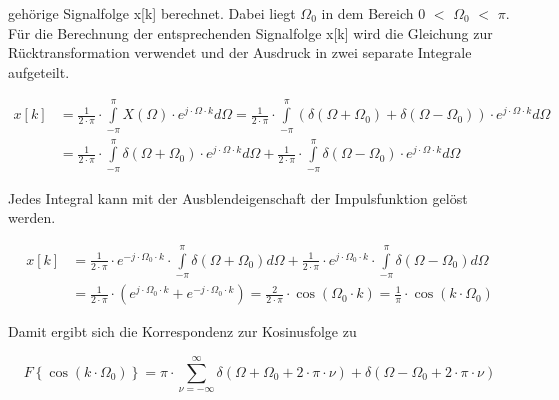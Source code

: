 \noindent geh\"{o}rige Signalfolge x[k] berechnet. Dabei liegt $\Omega_{0}$ in dem Bereich 0 $\mathrm{<}$ $\Omega_{0}$ $\mathrm{<}$ $\pi$. F\"{u}r die Berechnung der entsprechenden Signalfolge x[k] wird die Gleichung zur R\"{u}cktransformation verwendet und der Ausdruck in zwei separate Integrale aufgeteilt.

\begin{equation}\label{eq:sevenfourtysix}
\begin{split}
x\left[k\right] &=\frac{1}{2\cdot \pi } \cdot \int\limits _{-\pi }^{\pi }X\left(\Omega \right)\cdot e^{j\cdot \Omega \cdot k}d\Omega  =\frac{1}{2\cdot \pi } \cdot \int\limits _{-\pi }^{\pi }\left(\delta \left(\Omega +\Omega _{0} \right)+\delta \left(\Omega -\Omega _{0} \right)\right)\cdot e^{j\cdot \Omega \cdot k}d\Omega\\ 
&=\frac{1}{2\cdot \pi} \cdot\int\limits _{-\pi }^{\pi }\delta \left(\Omega +\Omega _{0} \right)\cdot e^{j\cdot \Omega \cdot k}d\Omega+\frac{1}{2\cdot \pi} \cdot\int\limits _{-\pi }^{\pi }\delta \left(\Omega -\Omega _{0} \right)\cdot e^{j\cdot \Omega \cdot k}d\Omega
\end{split}
\end{equation}

\noindent Jedes Integral kann mit der Ausblendeigenschaft der Impulsfunktion gel\"{o}st werden.

\begin{equation}\label{eq:sevenfourtyseven}
\begin{split}
x\left[k\right] &=\frac{1}{2\cdot \pi } \cdot e^{-j\cdot \Omega _{0} \cdot k} \cdot \int\limits _{-\pi }^{\pi }\delta \left(\Omega +\Omega _{0} \right)d\Omega  +\frac{1}{2\cdot \pi } \cdot e^{j\cdot \Omega _{0} \cdot k} \cdot \int\limits _{-\pi }^{\pi }\delta \left(\Omega -\Omega _{0} \right)d\Omega \\
&=\frac{1}{2\cdot \pi } \cdot ( e^{j\cdot \Omega _{0} \cdot k}+e^{-j\cdot \Omega _{0} \cdot k})=\frac{2}{2\cdot \pi } \cdot \cos(\Omega _{0} \cdot k)=\frac{1}{\pi}\cdot \cos(k\cdot\Omega_{0})
\end{split}
\end{equation}

\noindent Damit ergibt sich die Korrespondenz zur Kosinusfolge zu

\begin{equation}\label{eq:sevenfourtyeight}
F\left\{\cos \left(k\cdot \Omega _{0} \right)\right\}=\pi \cdot \sum _{\nu =-\infty }^{\infty }\delta \left(\Omega +\Omega _{0} +2\cdot \pi \cdot \nu \right)+\delta \left(\Omega -\Omega _{0} +2\cdot \pi \cdot \nu \right)
\end{equation}

